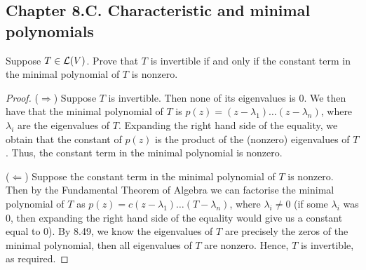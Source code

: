 \subsection*{Chapter 8.C. Characteristic and minimal polynomials}


\begin{exercise}{8}
  Suppose $T\in\mathcal{L}(V)$. Prove that $T$ is invertible if and only if the constant term in the minimal polynomial of $T$ is nonzero.
\end{exercise}
\begin{proof}
 ($\Rightarrow$) Suppose $T$ is invertible. Then none of its eigenvalues is 0. We then have that the minimal polynomial of $T$ is $p(z)=(z-\lambda_1)\dots(z-\lambda_n)$, where $\lambda_i$ are the eigenvalues of $T$. Expanding the right hand side of the equality, we obtain that the constant of $p(z)$ is the product of the (nonzero) eigenvalues of $T$. Thus, the constant term in the minimal polynomial is nonzero.

 ($\Leftarrow$) Suppose the constant term in the minimal polynomial of $T$ is nonzero. Then by the Fundamental Theorem of Algebra we can factorise the minimal polynomial of $T$ as $p(z)=c(z-\lambda_1)\dots(T-\lambda_n)$, where $\lambda_i\neq 0$ (if some $\lambda_i$ was 0, then expanding the right hand side of the equality would give us a constant equal to 0). By 8.49, we know the eigenvalues of $T$ are precisely the zeros of the minimal polynomial, then all eigenvalues of $T$ are nonzero. Hence, $T$ is invertible, as required.
\end{proof}

